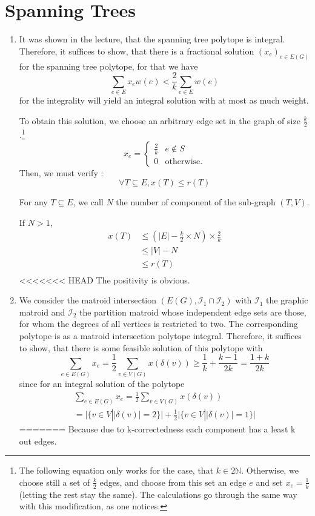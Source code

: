 \documentclass{scrartcl}
\newcommand\1{\mathbf{1}}
\begin{document}
\section{Spanning Trees}
\begin{enumerate}
\item
It was shown in the lecture, that the spanning tree polytope is integral. Therefore, it suffices to show, that there is a fractional solution $(x_e)_{e \in E(G)}$ for the spanning tree polytope, for that we have
\[
\sum_{e \in E} x_e w(e) < \frac{2}{k} \sum_{e \in E} w(e)
\]
for the integrality will yield an integral solution with at most as much weight.

To obtain this solution, we choose an arbitrary edge set in the graph of size $\frac{k}{2}$.\footnote{The following equation only works for the case, that $k\in 2\mathbb{N}$. Otherwise, we choose still a set of $\frac{k}{2}$ edges, and choose from this set an edge $e$ and set $x_e = \frac{1}{k}$ (letting the rest stay the same). The calculations go through the same way with this modification, as one notices.}
\[
x_e = \begin{cases} \frac{2}{k} & e \notin S \\ 0 &\text{otherwise.}\end{cases}
\]
Then, we must verify :
\[
\forall T \subseteq E, x(T) \leq r(T)
\]

For any $T\subseteq E$, we call $N$ the number of component of the sub-graph $(T,V)$.

If $N > 1$,
\begin{align*}
x(T) &\leq (|E| - \frac{k}{2} \times N ) \times\frac{2}{k} \\
&\leq |V| - N \\
&\leq r(T) \\
\end{align*}
<<<<<<< HEAD
The positivity is obvious.
\item
We consider the matroid intersection $(E(G), \mathcal{I}_1\cap \mathcal{I}_2)$ with $\mathcal{I}_1$ the graphic matroid and $\mathcal{I}_2$ the partition matroid whose independent edge sets are those, for whom the degrees of all vertices is restricted to two. The corresponding polytope is as a matroid intersection polytope integral. Therefore, it suffices to show, that there is some feasible solution of this polytope with
\[
\sum_{e \in E(G)} x_e = \frac{1}{2}\sum_{v \in V(G)} x(\delta(v)) \ge \frac{1}{k} + \frac{k-1}{2k}  = \frac{1+k}{2k}
\]
since for an integral solution of the polytope
\begin{multline*}
\sum_{e \in E(G)} x_e = \frac{1}{2} \sum_{v \in V(G)} x(\delta(v))\\ = \lvert\{v \in V| \lvert\delta (v)\rvert=2\}\rvert + \frac{1}{2} \lvert\{v \in V| \lvert\delta (v)\rvert=1\}\rvert
\end{multline*}
=======
Because due to k-correctedness each component has a least k out edges.


\end{enumerate}
\end{document}
